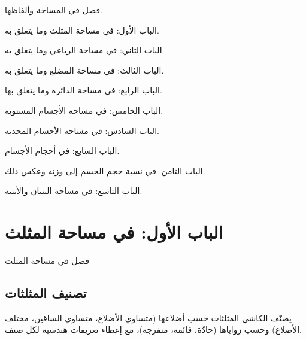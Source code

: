 \documentclass[11pt,a4paper]{book}
\newcommand{\ar}[1]{\arabicfont\beginR #1\endR}
\newcommand{\arLarge}[1]{{\Large\arabicfont\beginR #1\endR}}
\newenvironment{arabicbox}{%
  \begin{framed}
  \begin{minipage}{\linewidth-2\fboxsep-2\fboxrule}
  \setlength{\parindent}{0pt}
  \linespread{1.3}\selectfont
}{%
  \end{minipage}
  \end{framed}
}
\begin{document}
\begin{arabicbox}
\ar{فصل في المساحة وألفاظها.}

\vspace{0.3cm}
\ar{الباب الأول: في مساحة المثلث وما يتعلق به.}

\vspace{0.2cm}
\ar{الباب الثاني: في مساحة الرباعي وما يتعلق به.}

\vspace{0.2cm}
\ar{الباب الثالث: في مساحة المضلع وما يتعلق به.}

\vspace{0.2cm}
\ar{الباب الرابع: في مساحة الدائرة وما يتعلق بها.}

\vspace{0.2cm}
\ar{الباب الخامس: في مساحة الأجسام المستوية.}

\vspace{0.2cm}
\ar{الباب السادس: في مساحة الأجسام المحدبة.}

\vspace{0.2cm}
\ar{الباب السابع: في أحجام الأجسام.}

\vspace{0.2cm}
\ar{الباب الثامن: في نسبة حجم الجسم إلى وزنه وعكس ذلك.}

\vspace{0.2cm}
\ar{الباب التاسع: في مساحة البنيان والأبنية.}
\end{arabicbox}

\section{\ar{الباب الأول: في مساحة المثلث}}

\begin{arabicbox}
\begin{center}
\arLarge{فصل في مساحة المثلث}
\end{center}
\end{arabicbox}

\vspace{0.3cm}

\subsection{\ar{تصنيف المثلثات}}

\noindent\ar{يصنّف الكاشي المثلثات حسب أضلاعها (متساوي الأضلاع، متساوي الساقين، مختلف الأضلاع) وحسب زواياها (حادّة، قائمة، منفرجة)، مع إعطاء تعريفات هندسية لكل صنف.}
\end{document}
